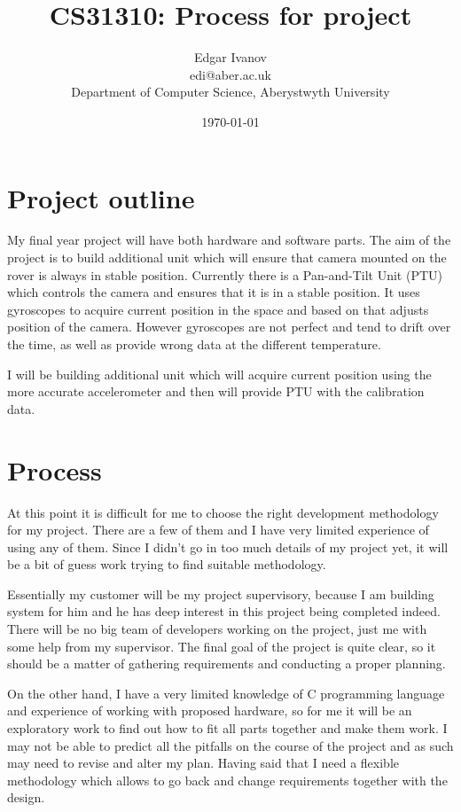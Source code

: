 \documentclass[]{report}
\begin{document}
\title{CS31310: Process for project}
\author{Edgar Ivanov\\ edi@aber.ac.uk \\ Department of Computer Science, Aberystwyth University}
\date{\today}
\maketitle
\section*{Project outline}
My final year project will have both hardware and software parts. The aim of the project is to build additional unit which will ensure that camera mounted on the rover is always in stable position. Currently there is a Pan-and-Tilt Unit (PTU) which controls the camera and ensures that it is in a stable position. It uses gyroscopes to acquire current position in the space and based on that adjusts position of the camera. However gyroscopes are not perfect and tend to drift over the time, as well as provide wrong data at the different temperature. 

I will be building additional unit which will acquire current position using the more accurate accelerometer and then will provide PTU with the calibration data.

\section*{Process}
At this point it is difficult for me to choose the right development methodology for my project. There are a few of them and I have very limited experience of using any of them. Since I didn't go in too much details of my project yet, it will be a bit of guess work trying to find suitable methodology.

Essentially my customer will be my project supervisory, because I am building system for him and he has deep interest in this project being completed indeed. There will be no big team of developers working on the project, just me with some help from my supervisor. The final goal of the project is quite clear, so it should be a matter of gathering requirements and conducting a proper planning.

On the other hand, I have a very limited knowledge of C programming language and experience of working with proposed hardware, so for me it will be an exploratory work to find out how to fit all parts together and make them work. I may not be able to predict all the pitfalls on the course of the project and as such may need to revise and alter my plan. Having said that I need a flexible methodology which allows to go back and change requirements together with the design.  
\end{document}
